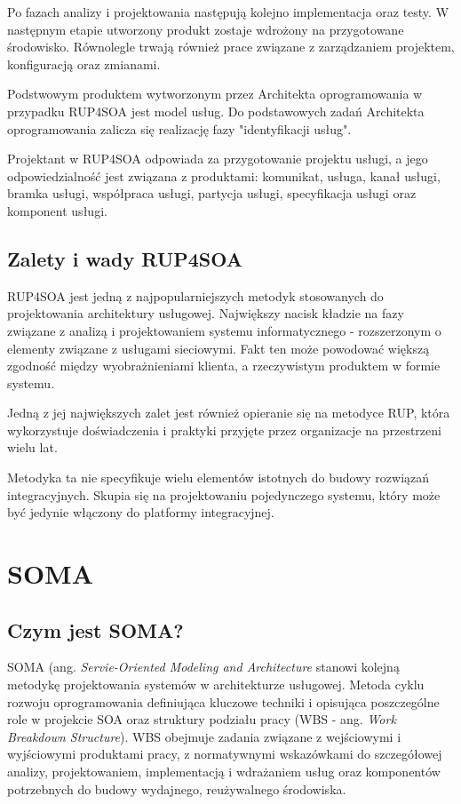 Po fazach analizy i projektowania następują kolejno implementacja oraz testy. W następnym etapie utworzony produkt zostaje wdrożony na przygotowane środowisko. Równolegle trwają również prace związane z zarządzaniem projektem, konfiguracją oraz zmianami. \cite{PlatIntGor}

Podstwowym produktem wytworzonym przez Architekta oprogramowania w przypadku RUP4SOA jest model usług. Do podstawowych zadań Architekta oprogramowania zalicza się realizację fazy "identyfikacji usług".

Projektant w RUP4SOA odpowiada za przygotowanie projektu usługi, a jego odpowiedzialność jest związana z produktami: komunikat, usługa, kanał usługi, bramka usługi, współpraca usługi, partycja usługi, specyfikacja usługi oraz komponent usługi. 

\subsection{Zalety i wady RUP4SOA}
RUP4SOA jest jedną z najpopularniejszych metodyk stosowanych do projektowania architektury usługowej. Największy nacisk kładzie na fazy związane z analizą i projektowaniem systemu informatycznego - rozszerzonym o elementy związane z usługami sieciowymi. Fakt ten może powodować większą zgodność między wyobrażnieniami klienta, a rzeczywistym produktem w formie systemu. 

Jedną z jej największych zalet jest również opieranie się na metodyce RUP, która wykorzystuje doświadczenia i praktyki przyjęte przez organizacje na przestrzeni wielu lat. \cite{JonSimRUPSoa}

Metodyka ta nie specyfikuje wielu elementów istotnych do budowy rozwiązań integracyjnych. Skupia się na projektowaniu pojedynczego systemu, który może być jedynie włączony do platformy integracyjnej. \cite{PlatIntGor}

\section{SOMA}
\subsection{Czym jest SOMA?}
SOMA (ang. \textit{Servie-Oriented Modeling and Architecture} stanowi kolejną metodykę projektowania systemów w architekturze usługowej. \cite{PlatIntGor} Metoda cyklu rozwoju oprogramowania definiująca kluczowe techniki i opisująca poszczególne role w projekcie SOA oraz struktury podziału pracy (WBS - ang. \textit{Work Breakdown Structure}). WBS obejmuje zadania związane z wejściowymi i wyjściowymi produktami pracy, z normatywnymi wskazówkami do szczegółowej analizy, projektowaniem, implementacją i wdrażaniem usług oraz komponentów potrzebnych do budowy wydajnego, reużywalnego środowiska.

